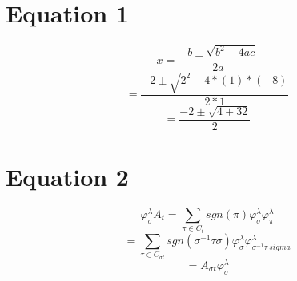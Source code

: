 \documentclass[a4paper]{article}
\begin{document}
	\section*{Equation 1}
	\begin{fleqn}
		\[
		x = \frac{-b \pm \sqrt{b^{2}-4ac}}{2a}
		\]
		\[
		= \frac{-2 \pm \sqrt{2^{2}-4*(1)*(-8)}}{2*1}
		\]
		\[
		= \frac{-2 \pm \sqrt{4+32}}{2}
		\]
	\end{fleqn}
	\section*{Equation 2}
	\begin{fleqn}
		\[
		\varphi^{\lambda}_{\sigma}A_{t} = \sum_{\pi \in C_{t}} sgn(\pi)\varphi^{\lambda}_{\sigma}\varphi^{\lambda}_{\pi}
		\]
		\[
		= \sum_{\tau \in C_{\sigma t}}
		sgn(\sigma^{-1}\tau\sigma)\varphi^{\lambda}_{\sigma}\varphi^{\lambda}_{\sigma^{-1}\tau\
			sigma}
		\]
		\[
		= A_{\sigma t} \varphi^{\lambda}_{\sigma}
		\]
	\end{fleqn}
\end{document}
